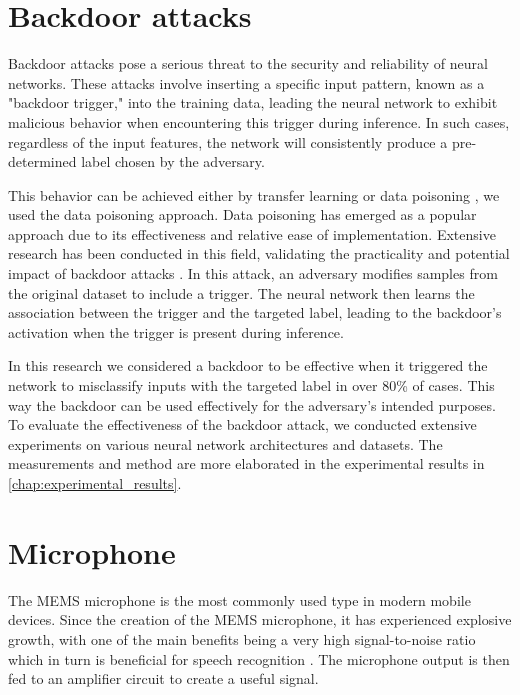 \documentclass{report}
\theoremstyle{definition}
\theoremstyle{remark}
\begin{document}
\section{Backdoor attacks}
Backdoor attacks pose a serious threat to the security and reliability of neural networks. These attacks involve inserting a specific input pattern, known as a "backdoor trigger," into the training data, leading the neural network to exhibit malicious behavior when encountering this trigger during inference. In such cases, regardless of the input features, the network will consistently produce a pre-determined label chosen by the adversary.

This behavior can be achieved either by transfer learning \cite{LATENTBACKDOORS} or data poisoning \cite{OVERVIEWBACKDOOR}, we used the data poisoning approach. Data poisoning has emerged as a popular approach due to its effectiveness and relative ease of implementation. Extensive research has been conducted in this field, validating the practicality and potential impact of backdoor attacks \cite{CYHI} \cite{BACKDOORCOMPARE} \cite{BADNETS}. In this attack, an adversary modifies samples from the original dataset to include a  trigger.  The neural network then learns the association between the trigger and the targeted label, leading to the backdoor's activation when the trigger is present during inference.

In this research we considered a backdoor to be effective when it triggered the network to misclassify inputs with the targeted label in over 80\% of cases. This way the backdoor can be used effectively for the adversary's intended purposes. To evaluate the effectiveness of the backdoor attack, we conducted extensive experiments on various neural network architectures and datasets. The measurements and method are more elaborated in the experimental results in \autoref{chap:experimental_results}. 



\section{Microphone}
The MEMS microphone is the most commonly used type in modern mobile devices. Since the creation of the MEMS microphone, it has experienced explosive growth, with one of the main benefits being a very high signal-to-noise ratio which in turn is beneficial for speech recognition \cite{7180939}. The microphone output is then fed to an amplifier circuit to create a useful signal.
\end{document}
